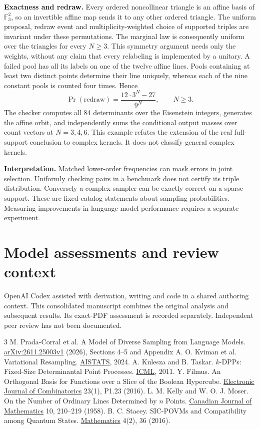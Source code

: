 \documentclass[11pt]{article}
\begin{document}
\textbf{Exactness and redraw.} Every ordered noncollinear triangle is an affine basis of $\mathbb F_3^2$, so an invertible affine map sends it to any other ordered triangle. The uniform proposal, redraw event and multiplicity-weighted choice of supported triples are invariant under these permutations. The marginal law is consequently uniform over the triangles for every $N\ge3$. This symmetry argument needs only the weights, without any claim that every relabeling is implemented by a unitary. A failed pool has all its labels on one of the twelve affine lines. Pools containing at least two distinct points determine their line uniquely, whereas each of the nine constant pools is counted four times. Hence
\[
       \Pr(\mathrm{redraw})=\frac{12\cdot3^N-27}{9^N}, \qquad N\ge3.
\]
The checker computes all 84 determinants over the Eisenstein integers, generates the affine orbit, and independently sums the conditional output masses over count vectors at $N=3,4,6$. This example refutes the extension of the real full-support conclusion to complex kernels. It does not classify general complex kernels.

\textbf{Interpretation.} Matched lower-order frequencies can mask errors in joint selection. Uniformly checking pairs in a benchmark does not certify its triple distribution. Conversely a complex sampler can be exactly correct on a sparse support. These are fixed-catalog statements about sampling probabilities. Measuring improvements in language-model performance requires a separate experiment.


\newpage
\section*{Model assessments and review context}
OpenAI Codex assisted with derivation, writing and code in a shared authoring context. This consolidated manuscript combines the original analysis and subsequent results. Its exact-PDF assessment is recorded separately. Independent peer review has not been documented.
\begin{thebibliography}{3}\setlength{\itemsep}{0pt}\small
{} M. Prada-Corral et al. A Model of Diverse Sampling from Language Models. \href{https://arxiv.org/abs/2611.25003v1}{arXiv:2611.25003v1} (2026), Sections 4--5 and Appendix A.
 O. Kviman et al. Variational Resampling. \href{https://proceedings.mlr.press/v238/kviman24a.html}{AISTATS}, 2024.
 A. Kulesza and B. Taskar. $k$-DPPs: Fixed-Size Determinantal Point Processes. \href{https://icml.cc/2011/papers/611_icmlpaper.pdf}{ICML}, 2011.
 Y. Filmus. An Orthogonal Basis for Functions over a Slice of the Boolean Hypercube. \href{https://www.combinatorics.org/ojs/index.php/eljc/article/view/v23i1p23}{Electronic Journal of Combinatorics} 23(1), P1.23 (2016).
 L. M. Kelly and W. O. J. Moser. On the Number of Ordinary Lines Determined by $n$ Points. \href{https://doi.org/10.4153/CJM-1958-024-6}{Canadian Journal of Mathematics} 10, 210--219 (1958).
 B. C. Stacey. SIC-POVMs and Compatibility among Quantum States. \href{https://doi.org/10.3390/math4020036}{Mathematics} 4(2), 36 (2016).
\end{thebibliography}
\end{document}
